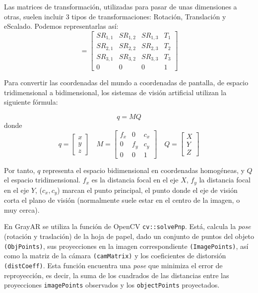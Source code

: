 Las matrices de transformación, utilizadas para pasar de unas dimensiones a otras, suelen incluir 3 tipos de transformaciones: Rotación, Translación y eScalado. Podemos representarlas así:
\begin{equation}
  [R|t] = \begin{bmatrix} SR_{1,1} & SR_{1,2} & SR_{1,3} & T_{1}  \\
                          SR_{2,1} & SR_{2,2} & SR_{2,3} & T_{2}  \\
                          SR_{3,1} & SR_{3,2} & SR_{3,3} & T_{3}  \\
                             0    &     0    &     0    &  1
  \end{bmatrix}
\end{equation}

Para convertir las coordenadas del mundo a coordenadas de pantalla, de espacio tridimensional a bidimensional, los sistemas de visión artificial utilizan la siguiente fórmula:

\begin{equation}
q=MQ
\end{equation}
donde
\begin{equation}
  q=\begin{bmatrix} x \\ y \\ z \end{bmatrix} \quad M=\begin{bmatrix} f_{x} & 0 & c_{x} \\ 0 & f_{y} & c_{y} \\ 0 & 0 & 1 \end{bmatrix} \quad Q=\begin{bmatrix} X \\ Y \\ Z \end{bmatrix}
\end{equation}

Por tanto, $q$ representa el espacio bidimensional en coordenadas homogéneas, y $Q$ el espacio
tridimensional. $f_{x}$ es la distancia focal en el eje $X$, $f_{y}$ la distancia focal en el eje
$Y$, ($c_{x},c_{y}$) marcan el punto principal, el punto donde el eje de visión corta el plano de
visión (normalmente suele estar en el centro de la imagen, o muy cerca).

En GrayAR se utiliza la función de OpenCV \texttt{cv::solvePnp}. Está, calcula la \emph{pose} (rotación y
traslación) de la hoja de papel, dado un conjunto de puntos del objeto \texttt{(ObjPoints)}, sus proyecciones en
la imagen correspondiente \texttt{(ImagePoints)}, así como la matriz de la cámara \texttt{(camMatrix)} y los coeficientes
de distorsión \texttt{(distCoeff)}. Esta función encuentra una \emph{pose} que minimiza el error de reproyección, es
decir, la suma de los cuadrados de las distancias entre las proyecciones \texttt{imagePoints} observados y
los \texttt{objectPoints} proyectados.


